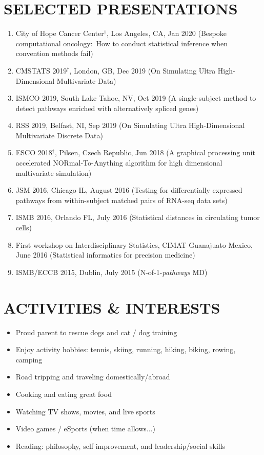 \documentclass[paper=a4,fontsize=11pt]{scrartcl} %
\newcommand{\NewPart}[2]{\section*{\uppercase{#1} #2 }}
\newcommand{\TalkEntry}[4]{
		\noindent #1, #2, #3 #4}
\begin{document}
\NewPart{Selected presentations}{}
\vspace{-7pt}
\begin{enumerate}[noitemsep]
\item \TalkEntry{City of Hope Cancer Center$^{\dagger}$}{Los Angeles, CA}{Jan 2020}{(Bespoke computational oncology:~How to conduct statistical inference when convention methods fail)}
\item \TalkEntry{CMSTATS 2019$^{\dagger}$}{London, GB}{Dec 2019}{(On Simulating Ultra High-Dimensional Multivariate Data)}
\item \TalkEntry{ISMCO 2019}{South Lake Tahoe, NV}{Oct 2019}{(A single-subject method to detect pathways enriched with alternatively spliced genes)}
\item \TalkEntry{RSS 2019}{Belfast, NI}{Sep 2019}{(On Simulating Ultra High-Dimensional Multivariate Discrete Data)}
\item \TalkEntry{ESCO 2018$^{\dagger}$}{Pilsen, Czech Republic}{Jun 2018}{(A graphical processing unit accelerated NORmal-To-Anything algorithm for high dimensional multivariate simulation)}
\item\TalkEntry{JSM 2016}{Chicago IL}{August 2016}{(Testing for differentially expressed pathways from within-subject matched pairs of RNA-seq data sets)}
  \item\TalkEntry{ISMB 2016}{Orlando FL}{July 2016}{(Statistical distances in circulating tumor cells)}
\item\TalkEntry{First workshop on Interdisciplinary Statistics}{CIMAT Guanajuato Mexico}{June 2016}{(Statistical informatics for precision medicine)} 
\item\TalkEntry{ISMB/ECCB 2015}{Dublin}{July 2015}{(N-of-1-\textit{pathways} MD)} 

\end{enumerate}

\NewPart{Activities \& Interests}{}
\vspace{-7pt}

\begin{itemize}[noitemsep]
\item Proud parent to rescue dogs and cat / dog training
\item Enjoy activity hobbies: tennis, skiing, running, hiking, biking, rowing, camping
\item Road tripping and traveling domestically/abroad
\item Cooking and eating great food
 \item Watching TV shows, movies, and live sports 
 \item Video games / eSports (when time allows...)
   \item Reading: philosophy, self improvement, and leadership/social skills
  \end{itemize}
\end{document}
